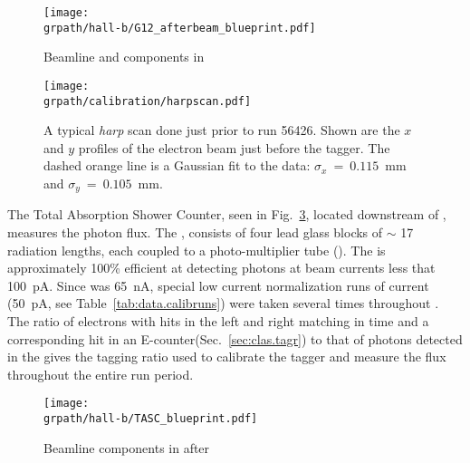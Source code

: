 \begin{figure}\begin{center}
\texttt{[image: \\grpath/hall-b/G12\_afterbeam\_blueprint.pdf]}
\caption[Beamline and  components in ]{\label{fig:clas.beam.aftermonitors}{}Beamline and  components in }
\end{center}\end{figure}

\begin{figure}\begin{center}
\texttt{[image: \\grpath/calibration/harpscan.pdf]}
\caption[Example \emph{harp} Scan for ]{\label{fig:clas.beam.harpscan}{}A typical \emph{harp} scan done just prior to run 56426. Shown are the $x$ and $y$ profiles of the electron beam just before the tagger. The dashed orange line is a Gaussian fit to the data: $\sigma_x~=~0.115$~mm and $\sigma_y~=~0.105$~mm.}
\end{center}\end{figure}

The Total Absorption Shower Counter, seen in Fig.~\ref{fig:clas.beam.afterCLAS}, located downstream of , measures the photon flux. The , consists of four lead glass blocks of $\sim$ 17 radiation lengths, each coupled to a photo-multiplier tube (\label{abbr:pmt}). The  is approximately 100\% efficient at detecting photons at beam currents less that 100~pA\cite{clas.tagger,clas.tagger.calib}. Since  was 65~nA, special low current normalization runs of current (50~pA, see Table~\ref{tab:data.calibruns}) were taken several times throughout . The ratio of electrons with hits in the left and right  matching in time and a corresponding hit in an E-counter(Sec.~\ref{sec:clas.tagr}) to that of photons detected in the  gives the tagging ratio used to calibrate the tagger and measure the flux throughout the entire  run period.

\begin{figure}[h!]\begin{center}
\texttt{[image: \\grpath/hall-b/TASC\_blueprint.pdf]}
\caption[Beamline and components after  ]{\label{fig:clas.beam.afterCLAS}{}Beamline components in  after }
\end{center}\end{figure}

\FloatBarrier